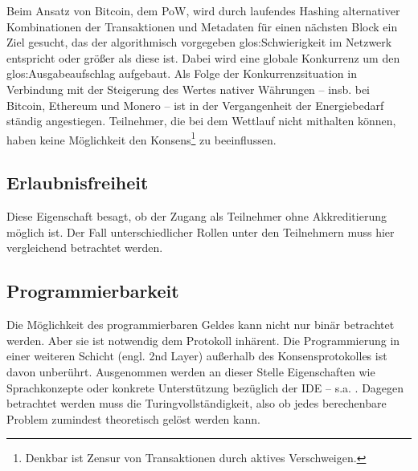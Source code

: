 Beim Ansatz von Bitcoin, dem \gls{PoW}, wird durch laufendes Hashing alternativer Kombinationen der Transaktionen und Metadaten für einen nächsten Block ein Ziel gesucht, das der algorithmisch vorgegeben \gls{glos:Schwierigkeit} im Netzwerk entspricht oder größer als diese ist. Dabei wird eine globale Konkurrenz um den \gls{glos:Ausgabeaufschlag} aufgebaut. Als Folge der Konkurrenzsituation in Verbindung mit der Steigerung des Wertes nativer Währungen -- insb. bei Bitcoin, Ethereum und Monero -- ist in der Vergangenheit der Energiebedarf ständig angestiegen. Teilnehmer, die bei dem Wettlauf nicht mithalten können, haben keine Möglichkeit den Konsens\footnote{Denkbar ist Zensur von Transaktionen durch aktives Verschweigen.} zu beeinflussen.

\subsection{Erlaubnisfreiheit}\label{krit:erlaubnisfreiheit}

Diese Eigenschaft besagt, ob der Zugang als Teilnehmer ohne Akkreditierung möglich ist.
Der Fall unterschiedlicher Rollen unter den Teilnehmern muss hier vergleichend betrachtet werden.



\subsection{Programmierbarkeit}\label{krit:programmierbarkeit}

Die Möglichkeit des programmierbaren Geldes kann nicht nur binär betrachtet werden.
Aber sie ist notwendig dem Protokoll inhärent. Die Programmierung in einer weiteren Schicht (engl. 2nd Layer) außerhalb des Konsensprotokolles ist davon unberührt.
Ausgenommen werden an dieser Stelle Eigenschaften wie Sprachkonzepte oder konkrete Unterstützung bezüglich der \gls{IDE} -- s.a. .
Dagegen betrachtet werden muss die Turingvollständigkeit, also ob jedes berechenbare Problem zumindest theoretisch gelöst werden kann.  

